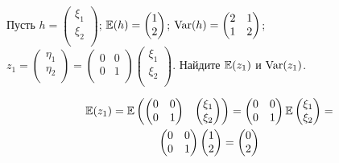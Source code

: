 \begin{problem}
 Пусть $h =  \begin{pmatrix}
\xi_1 \\
\xi_2 \\
\end{pmatrix} $; $\mathbb{E} (h) =  \begin{pmatrix}
1\\
2\\
\end{pmatrix} $; $\operatorname{Var} (h) =  \begin{pmatrix}
2 & 1 \\
1 & 2 \\
\end{pmatrix} $; $z_1 =  \begin{pmatrix}
\eta_1 \\
\eta_2 \\
\end{pmatrix}  =  \begin{pmatrix}
0 & 0 \\
0 & 1 \\
\end{pmatrix}   \begin{pmatrix}
\xi_1 \\
\xi_2 \\
\end{pmatrix} $. Найдите $\mathbb{E} (z_1)$ и $\operatorname{Var} (z_1)$.


\begin{sol}
\begin{multline*}
\mathbb{E} (z_1) = \mathbb{E}   \begin{pmatrix}
 \begin{pmatrix}
0 & 0 \\
0 & 1 \\
\end{pmatrix}  &  \begin{pmatrix}
\xi_1 \\
\xi_2 \\
\end{pmatrix}  \\
\end{pmatrix}  =  \begin{pmatrix}
0 & 0 \\
0 & 1 \\
\end{pmatrix}  \mathbb{E}   \begin{pmatrix}
\xi_1 \\
\xi_2 \\
\end{pmatrix}  = \\
 \begin{pmatrix}
0 & 0 \\
0 & 1 \\
\end{pmatrix}   \begin{pmatrix}
1\\
2\\
\end{pmatrix}  =  \begin{pmatrix}
0\\
2\\
\end{pmatrix}
\end{multline*}


\end{sol}
\end{problem}
